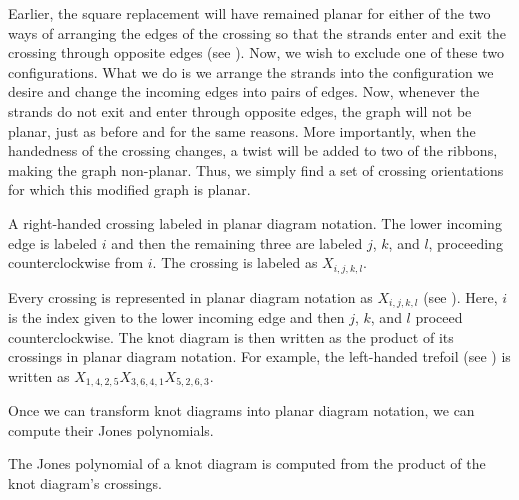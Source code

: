 \begin{paper}
Earlier, the square replacement will have remained planar for either of the two
ways of arranging the edges of the crossing so that the strands enter and exit
the crossing through opposite edges (see \figGraph).
Now, we wish to exclude one of these two configurations.
What we do is we arrange the strands into the configuration we desire and change
the incoming edges into pairs of edges.
Now, whenever the strands do not exit and enter through opposite edges, the
graph will not be planar, just as before and for the same reasons.
More importantly, when the handedness of the crossing changes, a twist will be
added to two of the ribbons, making the graph non-planar.
Thus, we simply find a set of crossing orientations for which this modified
graph is planar.

{A right-handed crossing labeled in planar diagram notation.
The lower incoming edge is labeled $i$ and then the remaining three are labeled
$j$, $k$, and $l$, proceeding counterclockwise from $i$.
The crossing is labeled as $X_{i,j,k,l}$.}

Every crossing is represented in planar diagram notation as $X_{i,j,k,l}$ (see
\figX).
Here, $i$ is the index given to the lower incoming edge and then $j$, $k$, and
$l$ proceed counterclockwise.
The knot diagram is then written as the product of its crossings in planar
diagram notation.
For example, the left-handed trefoil (see \figLabeled) is written as
$X_{1,4,2,5}X_{3,6,4,1}X_{5,2,6,3}$.


Once we can transform knot diagrams into planar diagram notation, we can compute
their Jones polynomials.


The Jones polynomial of a knot diagram is computed from the product of the knot
diagram's crossings.\\

\end{paper}
